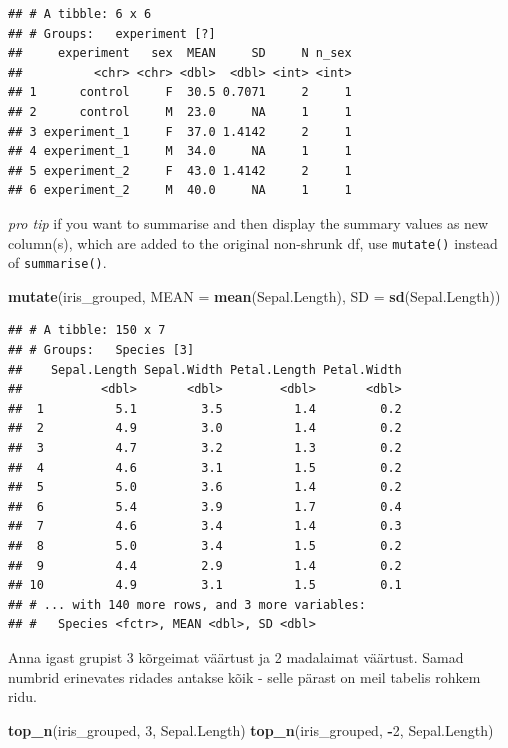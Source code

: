 \documentclass[]{book}
\newenvironment{Shaded}{\begin{snugshade}}{\end{snugshade}}
\newcommand{\KeywordTok}[1]{\textcolor[rgb]{0.13,0.29,0.53}{\textbf{#1}}}
\newcommand{\DataTypeTok}[1]{\textcolor[rgb]{0.13,0.29,0.53}{#1}}
\newcommand{\DecValTok}[1]{\textcolor[rgb]{0.00,0.00,0.81}{#1}}
\newcommand{\OperatorTok}[1]{\textcolor[rgb]{0.81,0.36,0.00}{\textbf{#1}}}
\newcommand{\NormalTok}[1]{#1}
\begin{document}
\begin{verbatim}
## # A tibble: 6 x 6
## # Groups:   experiment [?]
##     experiment   sex  MEAN     SD     N n_sex
##          <chr> <chr> <dbl>  <dbl> <int> <int>
## 1      control     F  30.5 0.7071     2     1
## 2      control     M  23.0     NA     1     1
## 3 experiment_1     F  37.0 1.4142     2     1
## 4 experiment_1     M  34.0     NA     1     1
## 5 experiment_2     F  43.0 1.4142     2     1
## 6 experiment_2     M  40.0     NA     1     1
\end{verbatim}

\emph{pro tip} if you want to summarise and then display the summary
values as new column(s), which are added to the original non-shrunk df,
use \texttt{mutate()} instead of \texttt{summarise()}.

\begin{Shaded}
\begin{Highlighting}[]
\KeywordTok{mutate}\NormalTok{(iris_grouped,}
       \DataTypeTok{MEAN =} \KeywordTok{mean}\NormalTok{(Sepal.Length), }
       \DataTypeTok{SD =} \KeywordTok{sd}\NormalTok{(Sepal.Length))}
\end{Highlighting}
\end{Shaded}

\begin{verbatim}
## # A tibble: 150 x 7
## # Groups:   Species [3]
##    Sepal.Length Sepal.Width Petal.Length Petal.Width
##           <dbl>       <dbl>        <dbl>       <dbl>
##  1          5.1         3.5          1.4         0.2
##  2          4.9         3.0          1.4         0.2
##  3          4.7         3.2          1.3         0.2
##  4          4.6         3.1          1.5         0.2
##  5          5.0         3.6          1.4         0.2
##  6          5.4         3.9          1.7         0.4
##  7          4.6         3.4          1.4         0.3
##  8          5.0         3.4          1.5         0.2
##  9          4.4         2.9          1.4         0.2
## 10          4.9         3.1          1.5         0.1
## # ... with 140 more rows, and 3 more variables:
## #   Species <fctr>, MEAN <dbl>, SD <dbl>
\end{verbatim}

Anna igast grupist 3 kõrgeimat väärtust ja 2 madalaimat väärtust. Samad
numbrid erinevates ridades antakse kõik - selle pärast on meil tabelis
rohkem ridu.

\begin{Shaded}
\begin{Highlighting}[]
\KeywordTok{top_n}\NormalTok{(iris_grouped, }\DecValTok{3}\NormalTok{, Sepal.Length)}
\KeywordTok{top_n}\NormalTok{(iris_grouped, }\OperatorTok{-}\DecValTok{2}\NormalTok{, Sepal.Length)}
\end{Highlighting}
\end{Shaded}
\end{document}
